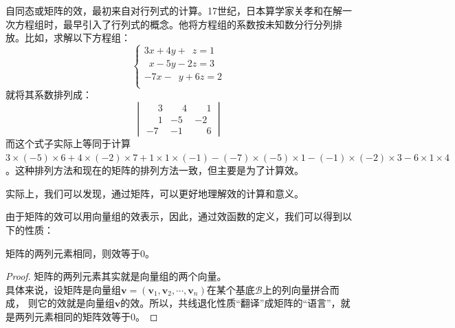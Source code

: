 \documentclass[12pt,UTF8]{ctexbook}
\begin{document}
自同态或矩阵的效，最初来自对行列式的计算。17世纪，日本算学家关孝和在解一次方程组时，最早引入了行列式的概念。他将方程组的系数按未知数分行分列排放。比如，求解以下方程组：
$$
\left\{
    \begin{aligned}
        3 x + 4 y + \phantom{2}z = 1 \\
        \phantom{2} x - 5 y - 2z = 3 \\
        -7 x - \phantom{2}y + 6z = 2 \\
    \end{aligned}
\right.
$$
就将其系数排列成：
$$
\begin{vmatrix}
    \phantom{-}3 & \phantom{-}4 & \phantom{-}1 \\
    \phantom{-}1 & -5 & -2 \\
    -7 & -1 & \phantom{-}6
\end{vmatrix}
$$
而这个式子实际上等同于计算$3\times(-5)\times6+4\times(-2)\times 7 + 1\times 1\times(-1) - (-7)\times(-5)\times 1 - (-1)\times(-2)\times 3 - 6\times 1\times 4$。这种排列方法和现在的矩阵的排列方法一致，但主要是为了计算效。

实际上，我们可以发现，通过矩阵，可以更好地理解效的计算和意义。

由于矩阵的效可以用向量组的效表示，因此，通过效函数的定义，我们可以得到以下的性质：
\begin{pp}\label{pp:10_36}
    矩阵的两列元素相同，则效等于$0$。
\end{pp}
\begin{proof} %
    矩阵的两列元素其实就是向量组的两个向量。\\
    具体来说，设矩阵是向量组$\mathbf{v} = (\mathbf{v}_1, \mathbf{v}_2, \cdots , \mathbf{v}_n)$在某个基底$\mathcal{B}$上的列向量拼合而成，
    则它的效就是向量组$\mathbf{v}$的效。所以，共线退化性质“翻译”成矩阵的“语言”，就是两列元素相同的矩阵效等于$0$。
\end{proof}
\end{document}
